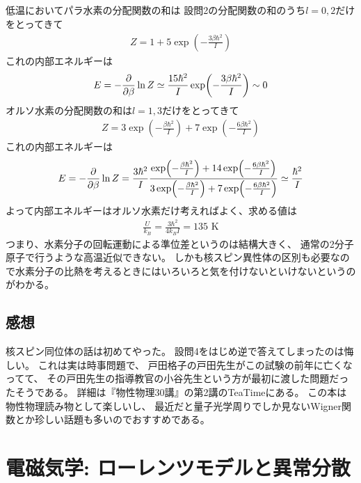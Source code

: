 \documentclass[../../master.tex]{subfiles}
\begin{document}
\subsection{}
低温においてパラ水素の分配関数の和は
設問2の分配関数の和のうち\(l=0,2\)だけをとってきて
\begin{align}
    Z = 1 +5\exp(-\frac{3\beta\hbar^2}{I})
\end{align}
これの内部エネルギーは
\begin{align}
    E = -\pdv{\beta}\ln Z \simeq \frac{15\hbar^2}{I}\exp(-\frac{3\beta\hbar^2}{I})\sim 0
\end{align}
オルソ水素の分配関数の和は\(l=1,3\)だけをとってきて
\begin{align}
    Z = 3\exp(-\frac{\beta\hbar^2}{I}) +7\exp(-\frac{6\beta\hbar^2}{I})
\end{align}
これの内部エネルギーは
\begin{align}
    E = -\pdv{\beta}\ln Z
    = \frac{3\hbar^2}{I}\dfrac{\exp(-\frac{\beta\hbar^2}{I}) +14\exp(-\frac{6\beta\hbar^2}{I})}{3\exp(-\frac{\beta\hbar^2}{I}) +7\exp(-\frac{6\beta\hbar^2}{I})}
    \simeq \frac{\hbar^2 }{I}
\end{align}
よって内部エネルギーはオルソ水素だけ考えればよく、求める値は
\begin{align}
    \frac{U}{k_B} = \frac{3\hbar^2}{4k_BI} = 135 \text{ K}
\end{align}
つまり、水素分子の回転運動による準位差というのは結構大きく、
通常の2分子原子で行うような高温近似できない。
しかも核スピン異性体の区別も必要なので水素分子の比熱を考えるときにはいろいろと気を付けないといけないというのがわかる。

\subsection*{感想}
核スピン同位体の話は初めてやった。
設問4をはじめ逆で答えてしまったのは悔しい。
これは実は時事問題で、
戸田格子の戸田先生がこの試験の前年に亡くなってて、
その戸田先生の指導教官の小谷先生という方が最初に渡した問題だったそうである。
詳細は『物性物理30講』の第2講のTeaTimeにある。
この本は物性物理読み物として楽しいし、
最近だと量子光学周りでしか見ないWigner関数とか珍しい話題も多いのでおすすめである。

\clearpage
\section{電磁気学: ローレンツモデルと異常分散}
\end{document}

